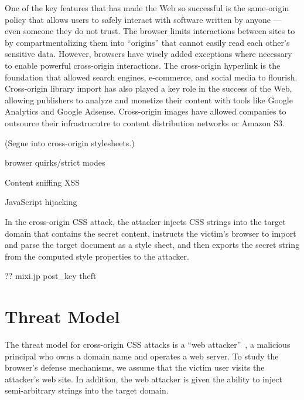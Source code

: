 \documentclass{acm_proc_article-sp}
\begin{document}
One of the key features that has made the Web so successful is the same-origin
policy that allows users to safely interact with software written by anyone
--- even someone they do not trust. The browser limits interactions between
sites to by compartmentalizing them into ``origins'' that cannot easily read
each other's sensitive data. However, browsers have wisely added exceptions where necessary to enable powerful cross-origin interactions. The cross-origin hyperlink is the foundation that allowed search engines, e-commerce, and social media to flourish. Cross-origin library import has also played a key role in the success of the Web, allowing publishers to analyze and monetize their content with tools like Google Analytics and Google Adsense. Cross-origin images have allowed companies to outsource their infrastrucutre to content distribution networks or Amazon S3.

(Segue into cross-origin stylesheets.)

browser quirks/strict modes

Content sniffing XSS~\cite{securecontentsniffing}

JavaScript hijacking~\cite{jshijacking}

In the cross-origin CSS attack, the attacker injects CSS strings into the target domain that contains the secret content, instructs the victim's browser to import and parse the target document as a style sheet, and then exports the secret string from the computed style properties to the attacker.

?? mixi.jp post\_key theft~\cite{cssxss}

\section{Threat Model}

The threat model for cross-origin CSS attacks is a ``web
attacker''~\cite{jackson09thesis}, a malicious principal who owns a domain
name and operates a web server. To study the browser's defense mechanisms, we
assume that the victim user visits the attacker's web site. In addition, the
web attacker is given the ability to inject semi-arbitrary strings into the
target domain.
% 
\end{document}
